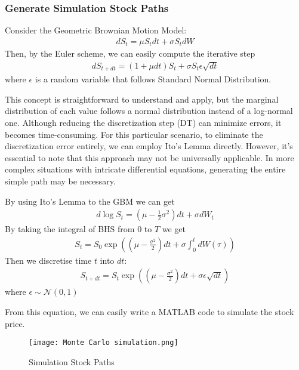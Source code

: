 \documentclass{article}
\begin{document}
\subsubsection{Generate Simulation Stock Paths}

 Consider the Geometric Brownian Motion Model:
    \begin{align*}
         dS_t = \mu S_t dt + \sigma S_t dW 
    \end{align*}
    Then, by the Euler scheme, we can easily compute the iterative step
    \begin{align*}
         dS_{t+dt} = (1+\mu dt) S_t  + \sigma S_t  \epsilon \sqrt{dt} 
    \end{align*}
    where $\epsilon$ is a random variable that follows Standard Normal Distribution.
    
    This concept is straightforward to understand and apply, but the marginal distribution of each value follows a normal distribution instead of a log-normal one. Although reducing the discretization step (DT) can minimize errors, it becomes time-consuming. For this particular scenario, to eliminate the discretization error entirely, we can employ Ito's Lemma directly. However, it's essential to note that this approach may not be universally applicable. In more complex situations with intricate differential equations, generating the entire simple path may be necessary.
    
    By using Ito's Lemma to the GBM we can get
    \begin{align*}
         d\log S_t = \left(\mu - \frac{1}{2}\sigma^2\right) dt + \sigma dW_t
    \end{align*}
    By taking the integral of BHS from 0 to $T$ we get
    \begin{align*}
         S_t = S_0 \exp\left((\mu - \frac{\sigma^2}{2}) dt + \sigma \int_{0}^{t} dW(\tau)\right)
    \end{align*}
    Then we discretise time $t$ into $dt$:
    \begin{align*}
         S_{t+dt} = S_t \exp\left((\mu - \frac{\sigma^2}{2}) dt + \sigma \epsilon \sqrt{dt} \right)
    \end{align*}
    where $\epsilon \sim \mathcal{N}(0, 1)$

    From this equation, we can easily write a MATLAB code to simulate the stock price.

    \begin{figure}
        \centering
        \texttt{[image: Monte Carlo simulation.png]}
        \caption{Simulation Stock Paths}
        \label{fig:enter-label}
    \end{figure}
\end{document}
